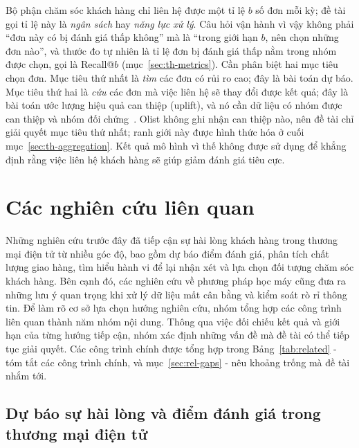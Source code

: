 \documentclass[12pt,a4paper]{report}
\begin{document}
Bộ phận chăm sóc khách hàng chỉ liên hệ được một tỉ lệ $b$ số đơn mỗi kỳ; đề tài gọi tỉ lệ này là \emph{ngân sách} hay \emph{năng lực xử lý}. Câu hỏi vận hành vì vậy không phải ``đơn này có bị đánh giá thấp không'' mà là ``trong giới hạn $b$, nên chọn những đơn nào'', và thước đo tự nhiên là tỉ lệ đơn bị đánh giá thấp nằm trong nhóm được chọn, gọi là Recall@$b$ (mục~\ref{sec:th-metrics}). Cần phân biệt hai mục tiêu chọn đơn. Mục tiêu thứ nhất là \emph{tìm} các đơn có rủi ro cao; đây là bài toán dự báo. Mục tiêu thứ hai là \emph{cứu} các đơn mà việc liên hệ sẽ thay đổi được kết quả; đây là bài toán ước lượng hiệu quả can thiệp (uplift), và nó cần dữ liệu có nhóm được can thiệp và nhóm đối chứng~\parencite{ascarza2018}. Olist không ghi nhận can thiệp nào, nên đề tài chỉ giải quyết mục tiêu thứ nhất; ranh giới này được hình thức hóa ở cuối mục~\ref{sec:th-aggregation}. Kết quả mô hình vì thế không được sử dụng để khẳng định rằng việc liên hệ khách hàng sẽ giúp giảm đánh giá tiêu cực.


\section{Các nghiên cứu liên quan}\label{sec:related}

Những nghiên cứu trước đây đã tiếp cận sự hài lòng khách hàng trong thương mại điện tử từ nhiều góc độ, bao gồm dự báo điểm đánh giá, phân tích chất lượng giao hàng, tìm hiểu hành vi để lại nhận xét và lựa chọn đối tượng chăm sóc khách hàng. Bên cạnh đó, các nghiên cứu về phương pháp học máy cũng đưa ra những lưu ý quan trọng khi xử lý dữ liệu mất cân bằng và kiểm soát rò rỉ thông tin. Để làm rõ cơ sở lựa chọn hướng nghiên cứu, nhóm tổng hợp các công trình liên quan thành năm nhóm nội dung. Thông qua việc đối chiếu kết quả và giới hạn của từng hướng tiếp cận, nhóm xác định những vấn đề mà đề tài có thể tiếp tục giải quyết. Các công trình chính được tổng hợp trong Bảng~\ref{tab:related} - tóm tắt các công trình chính, và mục~\ref{sec:rel-gaps} - nêu khoảng trống mà đề tài nhắm tới.

\subsection{Dự báo sự hài lòng và điểm đánh giá trong thương mại điện tử}\label{sec:rel-satisfaction}
\end{document}
